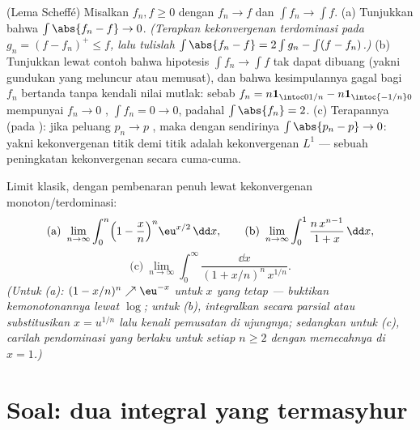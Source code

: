 \begin{exercise}[$\star\star$]\label{exo:b3:lebesgue:11}
(Lema Scheffé) Misalkan $f_n, f \geq 0$  dengan
$f_n \to f$  dan $\int f_n \to \int f$.
(a) Tunjukkan bahwa $\int\abs{f_n - f} \to 0$. \emph{(Terapkan
kekonvergenan terdominasi pada $g_n = (f - f_n)^+ \leq f$, lalu
tulislah $\int\abs{f_n - f} = 2\int g_n - \int(f - f_n)$.)}
(b) Tunjukkan lewat contoh bahwa hipotesis $\int f_n \to \int
f$ tak dapat dibuang (yakni gundukan yang meluncur atau memusat), dan
bahwa kesimpulannya gagal bagi $f_n$ bertanda tanpa
kendali nilai mutlak: sebab $f_n = n\mathbf 1_{\intoc0{1/n}} -
n\mathbf 1_{\intoc{-1/n}0}$ mempunyai $f_n \to 0$ , $\int f_n
= 0 \to 0$, padahal $\int\abs{f_n} = 2$.
(c) Terapannya (pada ): jika  peluang $p_n
\to p$ , maka dengan sendirinya $\int\abs{p_n - p} \to 0$:
yakni kekonvergenan titik demi titik  adalah kekonvergenan $L^1$ ---
sebuah peningkatan kekonvergenan secara cuma-cuma.
\end{exercise}

\begin{exercise}[$\star\star$]\label{exo:b3:lebesgue:12}
Limit klasik, dengan pembenaran penuh lewat kekonvergenan monoton/terdominasi:
\[
\text{(a)}\ \lim_{n\to\infty}\int_0^n\Bigl(1 -
\frac xn\Bigr)^n\eu^{x/2}\,\dd x, \qquad
\text{(b)}\ \lim_{n\to\infty}\int_0^1\frac{n\,x^{n-1}}{1 +
x}\,\dd x,
\]
\[
\text{(c)}\ \lim_{n\to\infty}\int_0^\infty
\frac{\dd x}{(1 + x/n)^n\,x^{1/n}} .
\]
\emph{(Untuk (a): $(1 - x/n)^n \nearrow \eu^{-x}$ untuk $x$ yang
tetap --- buktikan kemonotonannya lewat $\log$; untuk (b),
integralkan secara parsial atau substitusikan $x = u^{1/n}$ lalu kenali
pemusatan di ujungnya; sedangkan untuk (c), carilah pendominasi
 yang berlaku untuk setiap $n \geq 2$ dengan memecahnya di $x =
1$.)}
\end{exercise}

\section{Soal: dua integral yang termasyhur}

